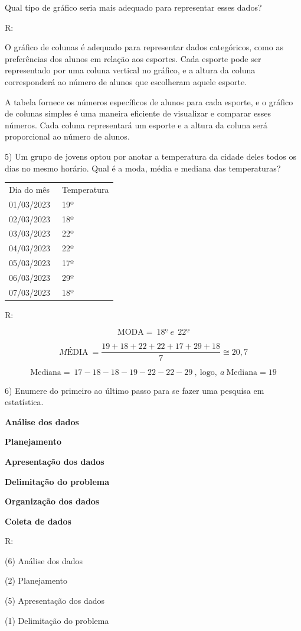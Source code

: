 Qual tipo de gráfico seria mais adequado para representar esses dados?

R:

O gráfico de colunas é adequado para representar dados categóricos, como
as preferências dos alunos em relação aos esportes. Cada esporte pode
ser representado por uma coluna vertical no gráfico, e a altura da
coluna corresponderá ao número de alunos que escolheram aquele esporte.

A tabela fornece os números específicos de alunos para cada esporte, e o
gráfico de colunas simples é uma maneira eficiente de visualizar e
comparar esses números. Cada coluna representará um esporte e a altura
da coluna será proporcional ao número de alunos.

5) Um grupo de jovens optou por anotar a temperatura da cidade deles
todos os dias no mesmo horário. Qual é a moda, média e mediana das
temperaturas?

\begin{longtable}[]{@{}ll@{}}
\toprule
\endhead
Dia do mês~ & Temperatura\tabularnewline
01/03/2023 & 19º\tabularnewline
02/03/2023 & 18º\tabularnewline
03/03/2023 & 22º\tabularnewline
04/03/2023 & 22º\tabularnewline
05/03/2023 & 17º\tabularnewline
06/03/2023 & 29º\tabularnewline
07/03/2023 & 18º\tabularnewline
\bottomrule
\end{longtable}

R:

\[\text{MODA} = \ 18º\ e\ \ 22º\]

\[MÉ\text{DIA}\  = \frac{19 + 18 + 22 + 22 + 17 + 29 + 18}{7} \cong 20,7\]

\[\text{Mediana} = \ 17 - 18 - 18 - 19 - 22 - 22 - 29\ ,\ \text{logo},\ a\ \text{Mediana} = 19\]

6) Enumere do primeiro ao último passo para se fazer uma pesquisa em
estatística.

\textbf{Análise dos dados}

\textbf{Planejamento}

\textbf{Apresentação dos dados}

\textbf{Delimitação do problema}

\textbf{Organização dos dados}

\textbf{Coleta de dados}

R:

(6) Análise dos dados

(2) Planejamento

(5) Apresentação dos dados

(1) Delimitação do problema

